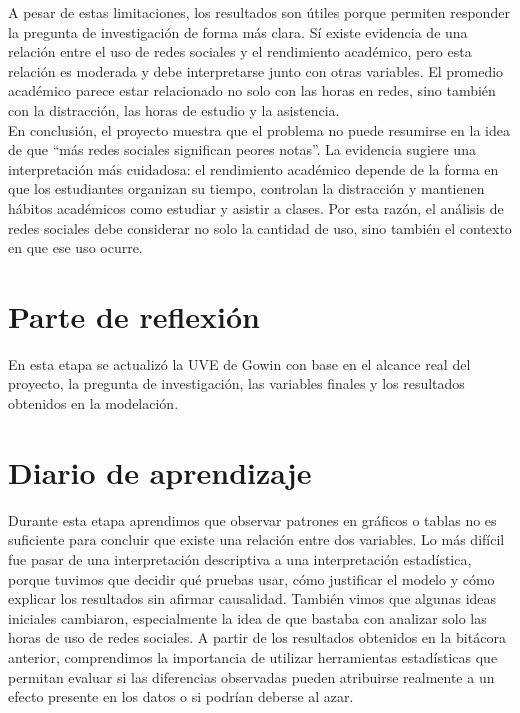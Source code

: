 \documentclass[12pt]{article}
\begin{document}
A pesar de estas limitaciones, los resultados son útiles porque permiten responder la pregunta de investigación de forma más clara. Sí existe evidencia de una relación entre el uso de redes sociales y el rendimiento académico, pero esta relación es moderada y debe interpretarse junto con otras variables. El promedio académico parece estar relacionado no solo con las horas en redes, sino también con la distracción, las horas de estudio y la asistencia.
\\

En conclusión, el proyecto muestra que el problema no puede resumirse en la idea de que ``más redes sociales significan peores notas''. La evidencia sugiere una interpretación más cuidadosa: el rendimiento académico depende de la forma en que los estudiantes organizan su tiempo, controlan la distracción y mantienen hábitos académicos como estudiar y asistir a clases. Por esta razón, el análisis de redes sociales debe considerar no solo la cantidad de uso, sino también el contexto en que ese uso ocurre.

\section{Parte de reflexión}

En esta etapa se actualizó la UVE de Gowin con base en el alcance real del proyecto, la pregunta de investigación, las variables finales y los resultados obtenidos en la modelación.

\clearpage



\clearpage

\section{Diario de aprendizaje}

Durante esta etapa aprendimos que observar patrones en gráficos o tablas no es suficiente para concluir que existe una relación entre dos variables. Lo más difícil fue pasar de una interpretación descriptiva a una interpretación estadística, porque tuvimos que decidir qué pruebas usar, cómo justificar el modelo y cómo explicar los resultados sin afirmar causalidad. También vimos que algunas ideas iniciales cambiaron, especialmente la idea de que bastaba con analizar solo las horas de uso de redes sociales. A partir de los resultados obtenidos en la bitácora anterior, comprendimos la importancia de utilizar herramientas estadísticas que permitan evaluar si las diferencias observadas pueden atribuirse realmente a un efecto presente en los datos o si podrían deberse al azar.
\\
\end{document}
